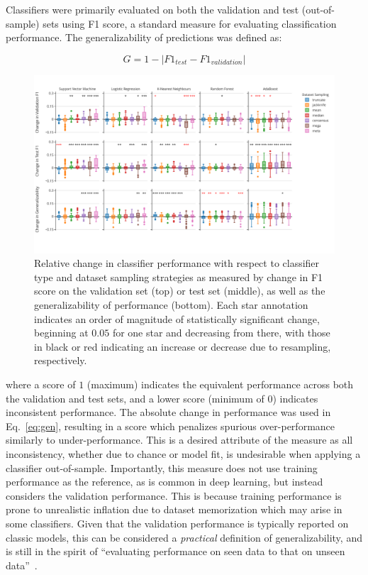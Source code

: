 \documentclass[10pt]{SelfArx} %
\newcommand{\new}[1]{\color{blue}#1\color{black}}
\begin{document}
Classifiers were primarily evaluated on both the validation and test (out-of-sample) sets using F1 score, a standard
measure for evaluating classification performance. The generalizability of predictions was defined as:

\begin{equation}
G = 1 - \lvert F1_{test} - F1_{validation} \rvert
\label{eq:gen}
\end{equation}

\begin{figure}[bth!]\centering
\includegraphics[width=\linewidth]{figures/1.pdf}
\caption{Relative change in classifier performance with respect to classifier type and dataset sampling strategies as
measured by change in F1 score on the validation set (top) or test set (middle), as well as the generalizability of
performance (bottom). Each star annotation indicates an order of magnitude of statistically significant change,
beginning at $0.05$ for one star and decreasing from there, with those in black or red indicating an increase or
decrease due to resampling, respectively.}
\label{fig:overall_perf}
\end{figure}

where a score of $1$ (maximum) indicates the equivalent performance across both the validation and test sets, and a
lower score (minimum of $0$) indicates inconsistent performance. The absolute change in performance was used in
Eq.~\ref{eq:gen}, resulting in a score which penalizes spurious over-performance similarly to under-performance. This
is a desired attribute of the measure as all inconsistency, whether due to chance or model fit, is undesirable when
applying a classifier out-of-sample. \new{Importantly, this measure does not use training performance as the reference,
as is common in deep learning, but instead considers the validation performance. This is because training performance
is prone to unrealistic inflation due to dataset memorization which may arise in some classifiers. Given that the
validation performance is typically reported on classic models, this can be considered a \textit{practical} definition
of generalizability, and is still in the spirit of ``evaluating performance on seen data to that on unseen
data''~\cite{shorten2019survey}}.
\end{document}
